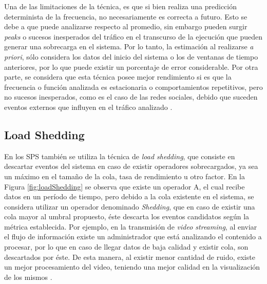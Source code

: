 Una de las limitaciones de la técnica, es que si bien realiza una predicción determinista de la frecuencia, no necesariamente es correcta a futuro. Esto se debe a que puede analizarse respecto al promedio, sin embargo pueden surgir \textit{peaks} o sucesos inesperados del tráfico en el transcurso de la ejecución que pueden generar una sobrecarga en el sistema. Por lo tanto, la estimación al realizarse \textit{a priori}, sólo considera los datos del inicio del sistema o los de ventanas de tiempo anteriores, por lo que puede existir un porcentaje de error considerable. Por otra parte, se considera que esta técnica posee mejor rendimiento si es que la frecuencia o función analizada es estacionaria o comportamientos repetitivos, pero no sucesos inesperados, como es el caso de las redes sociales, debido que suceden eventos externos que influyen en el tr\'afico analizado \citep{KarpSP03}.



\subsection{Load Shedding}
\label{sec:loadSheddingBC}

En los SPS también se utiliza la técnica de \textit{load shedding}, que consiste en descartar eventos del sistema en caso de existir operadores sobrecargados, ya sea un máximo en el tamaño de la cola, tasa de rendimiento u otro factor. En la Figura \ref{fig:loadShedding} se observa que existe un operador A, el cual recibe datos en un período de tiempo, pero debido a la cola existente en el sistema, se considera utilizar un operador denominado \textit{Shedding}, que en caso de existir una cola mayor al umbral propuesto, éste descarta los eventos candidatos según la métrica establecida. Por ejemplo, en la transmisión de \textit{video streaming}, al enviar el flujo de información existe un administrador que está analizando el contenido a procesar, por lo que en caso de llegar datos de baja calidad y existir cola, son descartados por éste. De esta manera, al existir menor cantidad de ruido, existe un mejor procesamiento del video, teniendo una mejor calidad en la visualización de los mismos \citep{SheuC09}. 

